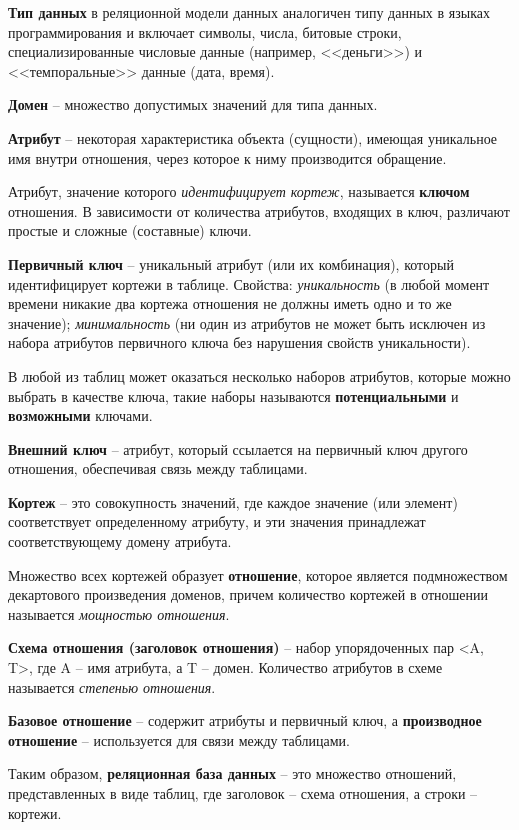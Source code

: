 \textbf{Тип данных} в реляционной модели данных аналогичен типу данных в языках программирования и включает символы, числа, битовые строки, специализированные числовые данные (например, <<деньги>>) и <<темпоральные>> данные (дата, время).

\textbf{Домен} -- множество допустимых значений для типа данных. 

\textbf{Атрибут} -- некоторая характеристика объекта (сущности), имеющая уникальное имя внутри отношения, через которое к ниму производится обращение.

Атрибут, значение которого \textit{идентифицирует кортеж}, называется \textbf{ключом} отношения. В зависимости от количества атрибутов, входящих в ключ, различают простые и сложные (составные) ключи.

\textbf{Первичный ключ} -- уникальный атрибут (или их комбинация), который идентифицирует кортежи в таблице. Свойства: \textit{уникальность} (в любой момент времени никакие два кортежа отношения не должны иметь одно и то же значение); \textit{минимальность} (ни один из атрибутов не может быть исключен из набора атрибутов первичного ключа без нарушения свойств уникальности). 

В любой из таблиц может оказаться несколько наборов атрибутов, которые можно выбрать в качестве ключа, такие наборы называются \textbf{потенциальными} и \textbf{возможными} ключами.

\textbf{Внешний ключ} -- атрибут, который ссылается на первичный ключ другого отношения, обеспечивая связь между таблицами.

\textbf{Кортеж} -- это совокупность значений, где каждое значение (или элемент) соответствует определенному атрибуту, и эти значения принадлежат соответствующему домену атрибута.

Множество всех кортежей образует \textbf{отношение}, которое является подмножеством декартового произведения доменов, причем количество кортежей в отношении называется \textit{мощностью отношения}.

\textbf{Схема отношения (заголовок отношения)} -- набор упорядоченных пар <A, T>, где A -- имя атрибута, а T -- домен. Количество атрибутов в схеме называется \textit{степенью отношения}.

\textbf{Базовое отношение} -- содержит атрибуты и первичный ключ, а \textbf{производное отношение} -- используется для связи между таблицами.

Таким образом,  \textbf{реляционная база данных} -- это множество отношений, представленных в виде таблиц, где заголовок -- схема отношения, а строки -- кортежи.

